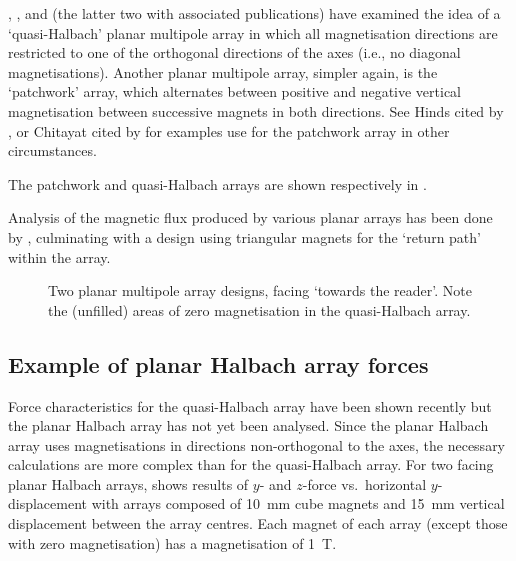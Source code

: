 \documentclass[11pt,a4paper]{memoir}
\begin{document}
\textcite{moser2002-maglev}, \textcite{rovers2009-ietm}, and \textcite{janssen2009-jsdd} (the latter two with associated publications) have examined the idea of a `quasi-Halbach' planar multipole array in which all magnetisation directions are restricted to one of the orthogonal directions of the axes (i.e., no diagonal magnetisations).
Another planar multipole array, simpler again, is the `patchwork' array, which alternates between positive and negative vertical magnetisation between successive magnets in both directions.
See Hinds cited by \textcite{kim1997-thesis}, or Chitayat cited by \textcite{cho2001} for examples use for the patchwork array in other circumstances.

The patchwork and quasi-Halbach arrays are shown respectively in .

Analysis of the magnetic flux produced by various planar arrays has been done by \textcite{cho2001}, culminating with a design using triangular magnets for the `return path' within the array.


\begin{figure}
\centering
{}\hfil
{}
\caption[Two planar multipole array designs.]{Two planar multipole array designs, facing `towards the reader'. Note the (unfilled) areas of zero magnetisation in the quasi-Halbach array.}
\end{figure}


\subsection{Example of planar Halbach array forces}

Force characteristics for the quasi-Halbach array have been shown recently \cite{janssen2009-jsdd} but the planar Halbach array has not yet been analysed.
Since the planar Halbach array uses magnetisations in directions non-orthogonal to the axes, the necessary calculations are more complex than for the quasi-Halbach array.
For two facing planar Halbach arrays,  shows results of $y$- and $z$-force vs.\ horizontal $y$-displacement with arrays composed of \SI{10}{mm} cube magnets and \SI{15}{mm} vertical displacement between the array centres.
Each magnet of each array (except those with zero magnetisation) has a magnetisation of \SI{1}{T}.
\end{document}
